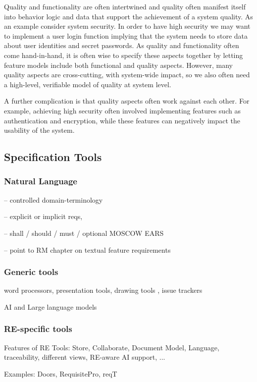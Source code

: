Quality and functionality are often intertwined and quality often manifest itself into behavior logic and data that support the achievement of a system quality. As an example consider system security. In order to have high security we may want to implement a user login function implying that the system needs to store data about user identities and secret passwords. As quality and functionality often come hand-in-hand, it is often wise to specify these aspects together by letting feature models include both functional and quality aspects. However, many quality aspects are cross-cutting, with system-wide impact, so we also often need a high-level, verifiable model of quality at system level. 

A further complication is that quality aspects often work against each other. For example, achieving high security often involved implementing features such as authentication and encryption, while these features can negatively impact the usability of the system.



\subsection{Specification Tools}

\subsubsection{Natural Language}

-- controlled domain-terminology 

-- explicit or implicit reqs, 

-- shall / should / must / optional MOSCOW EARS

-- point to RM chapter on textual feature requirements

\subsubsection{Generic tools}
  word processors, presentation tools, drawing tools , issue trackers 

  AI and Large language models 

\subsubsection{RE-specific tools}
  Features of RE Tools: Store, Collaborate, Document Model, Language, traceability, different views, RE-aware AI support, ...

  Examples: Doors, RequisitePro, reqT






